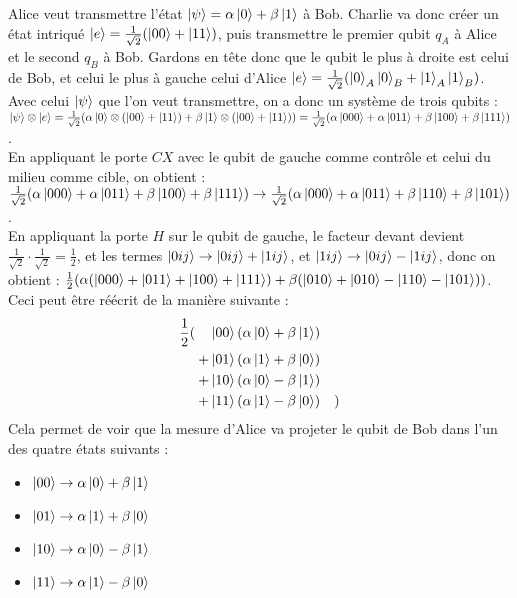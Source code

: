 Alice veut transmettre l'état $\ket{\psi} = \alpha \ket{0} + \beta \ket{1}$ à
Bob.
Charlie va donc créer un état intriqué $\ket{e} = \frac{1}{\sqrt{2}}
(\ket{00} + \ket{11})$, puis transmettre le premier qubit $q_A$ à Alice et le
second $q_B$ à Bob.
Gardons en tête donc que le qubit le plus à droite est celui de Bob, et celui
le plus à gauche celui d'Alice $\ket{e} = \frac{1}{\sqrt{2}} (\ket{0}_A \ket{0}_B
+ \ket{1}_A \ket{1}_B)$. \\
Avec celui $\ket{\psi}$ que l'on veut transmettre, on a donc un système de
trois qubits : $\ket{\psi} \otimes \ket{e} = \frac{1}{\sqrt{2}} (\alpha \ket{0}
\otimes (\ket{00} + \ket{11}) + \beta \ket{1} \otimes (\ket{00} + \ket{11})) =
\frac{1}{\sqrt{2}} (\alpha \ket{000} + \alpha \ket{011} + \beta \ket{100} +
\beta \ket{111})$.\\
En appliquant le porte $CX$ avec le qubit de gauche comme contrôle et celui du
milieu comme cible, on obtient : $ \frac{1}{\sqrt{2}} (\alpha \ket{000} + \alpha
\ket{011} + \beta \ket{100} + \beta \ket{111}) \rightarrow \frac{1}{\sqrt{2}}
(\alpha \ket{000} + \alpha \ket{011} + \beta \ket{110} + \beta \ket{101})$.\\
En appliquant la porte $H$ sur le qubit de gauche, le facteur devant devient
$\frac{1}{\sqrt{2}} \cdot \frac{1}{\sqrt{2}} = \frac{1}{2}$, et les termes
$\ket{0ij} \rightarrow \ket{0ij} + \ket{1ij}$, et $\ket{1ij} \rightarrow
\ket{0ij} - \ket{1ij}$, donc on obtient : $\frac{1}{2} (\alpha (\ket{000} +
\ket{011} + \ket{100} + \ket{111}) + \beta (\ket{010} + \ket{010} - \ket{110} -
\ket{101}))$.\\
Ceci peut être réécrit de la manière suivante :
\[
    \begin{split}
        \frac{1}{2}( \quad & \ket{00}(\alpha \ket{0} + \beta \ket{1}) \\
        + & \ket{01}(\alpha \ket{1} + \beta \ket{0}) \\
        + & \ket{10}(\alpha \ket{0} - \beta \ket{1}) \\
        + & \ket{11}(\alpha \ket{1} - \beta \ket{0}) \quad )
    \end{split}
\]
Cela permet de voir que la mesure d'Alice va projeter le qubit de Bob dans l'un
des quatre états suivants :
\begin{itemize}
    \item $\ket{00} \rightarrow \alpha \ket{0} + \beta \ket{1}$
    \item $\ket{01} \rightarrow \alpha \ket{1} + \beta \ket{0}$
    \item $\ket{10} \rightarrow \alpha \ket{0} - \beta \ket{1}$
    \item $\ket{11} \rightarrow \alpha \ket{1} - \beta \ket{0}$
\end{itemize}
